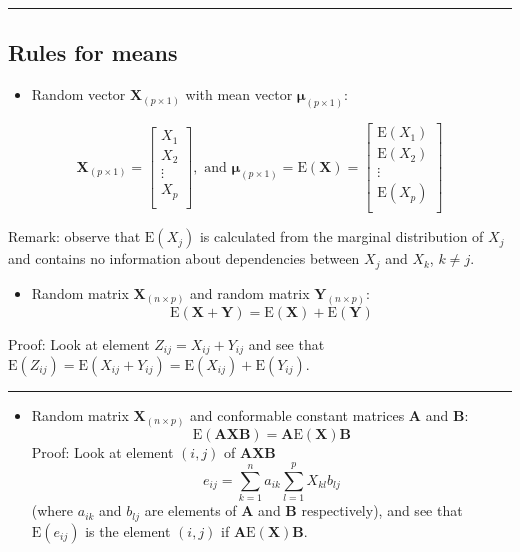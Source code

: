 \documentclass[]{article}
\providecommand{\tightlist}{%
  \setlength{\itemsep}{0pt}\setlength{\parskip}{0pt}}
\begin{document}
\begin{center}\rule{0.5\linewidth}{\linethickness}\end{center}

\hypertarget{rules-for-means}{%
\subsection{Rules for means}\label{rules-for-means}}

\begin{itemize}
\tightlist
\item
  Random vector \(\mathbf{X}_{(p\times 1)}\) with mean vector
  \(\mathbf{\mu}_{(p\times 1)}\):
\end{itemize}

\[\mathbf{X}_{(p\times 1)}=\left[ \begin{array}{c}X_1\\ X_2\\ \vdots\\ X_p\\ \end{array}\right], \text{ and }\mathbf{\mu}_{(p \times 1)}=\text{E}(\mathbf{X})=\left[ \begin{array}{c}\text{E}(X_1)\\ \text{E}(X_2)\\ \vdots\\ \text{E}(X_p)\\ \end{array}\right]\]

Remark: observe that \(\text{E}(X_j)\) is calculated from the marginal
distribution of \(X_j\) and contains no information about dependencies
between \(X_{j}\) and \(X_k\), \(k\neq j\).

\begin{itemize}
\tightlist
\item
  Random matrix \(\mathbf{X}_{(n\times p)}\) and random matrix
  \(\mathbf{Y}_{(n\times p)}\):
  \[\text{E}(\mathbf{X}+\mathbf{Y})=\text{E}(\mathbf{X})+\text{E}(\mathbf{Y})\]
\end{itemize}

Proof: Look at element \(Z_{ij}=X_{ij}+Y_{ij}\) and see that
\(\text{E}(Z_{ij})=\text{E}(X_{ij}+Y_{ij})=\text{E}(X_{ij})+\text{E}(Y_{ij})\).

\begin{center}\rule{0.5\linewidth}{\linethickness}\end{center}

\begin{itemize}
\tightlist
\item
  Random matrix \(\mathbf{X}_{(n\times p)}\) and conformable constant
  matrices \(\mathbf{A}\) and \(\mathbf{B}\):
  \[\text{E}(\mathbf{A}\mathbf{X}\mathbf{B})=\mathbf{A}\text{E}(\mathbf{X})\mathbf{B}\]
  Proof: Look at element \((i,j)\) of \(\mathbf{A}\mathbf{X}\mathbf{B}\)
  \[e_{ij}=\sum_{k=1}^n a_{ik} \sum_{l=1}^p X_{kl}b_{lj}\] (where
  \(a_{ik}\) and \(b_{lj}\) are elements of \(\mathbf{A}\) and
  \(\mathbf{B}\) respectively), and see that \(\text{E}(e_{ij})\) is the
  element \((i,j)\) if \(\mathbf{A}\text{E}(\mathbf{X})\mathbf{B}\).
\end{itemize}
\end{document}

